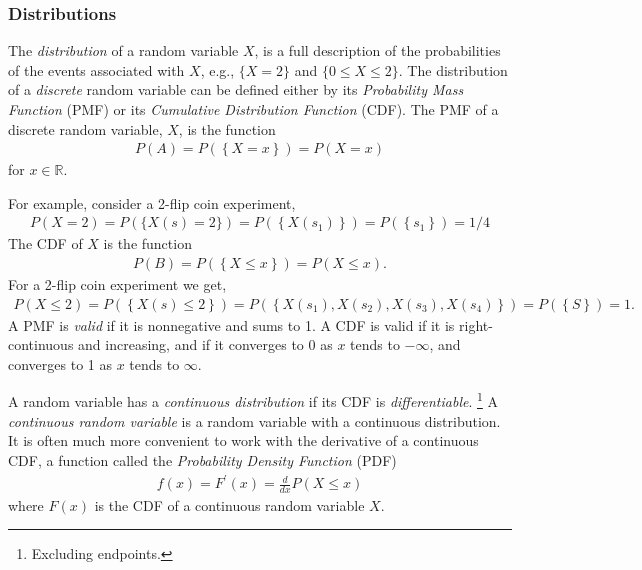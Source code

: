 \documentclass[11pt,a4paper]{article}
\begin{document}
\subsubsection{Distributions}

The \emph{distribution} of a random variable \(X\), 
is a full description of the probabilities of the events associated with \(X\),
e.g., \(\{ X = 2\}\) and \(\{ 0 \leq X \leq 2\}\). 
The distribution of a \emph{discrete} random variable can be defined either 
by its \emph{Probability Mass Function} (PMF) or 
its \emph{Cumulative Distribution Function} (CDF). 
The PMF of a discrete random variable, \(X\), is the function
\begin{align}
P(A) = P\left( \left\{ X = x \right\} \right) = P(X = x)
\end{align}
for \(x \in \mathbb{R}\). 

For example, 
consider a 2-flip coin experiment,
\begin{align}
P(X = 2) = 
P\left( \{ X(s) = 2\} \right) = 
P\left( \left\{ X(s_{1}) \right\} \right) = 
P(\left\{ s_{1} \right\}) = 1/4
\end{align}
The CDF of \(X\) is the function
\begin{align}
P(B) = 
P\left( \left\{ X \leq x \right\} \right) = 
P(X \leq x).
\end{align}
For a 2-flip coin experiment we get,
\begin{align}
P(X \leq 2) = 
P\left( \left\{ X(s) \leq 2 \right\} \right) = 
P\left( \left\{ X\left( s_{1} \right), X\left( s_{2} \right), X\left( s_{3} \right), X\left( s_{4} \right) \right\} \right) = 
P\left( \left\{ S \right\} \right) = 1.
\end{align}
A PMF is \emph{valid} if it is nonnegative and sums to 1. 
A CDF is valid if it is right-continuous and increasing, 
and if it converges to 0 as \(x\) tends to \(- \infty\), 
and converges to 1 as \(x\) tends to \(\infty\).

A random variable has a \emph{continuous distribution} if its 
CDF is \emph{differentiable}.%
\footnote{Excluding endpoints.} 
A \emph{continuous random variable} is a random variable with a continuous distribution. 
It is often much more convenient to work 
with the derivative of a continuous CDF, 
a function called the \emph{Probability Density Function} (PDF)
\begin{align}
f(x) = F^\prime(x) = \frac{d}{dx}P(X \leq x)
\end{align}
where \(F(x)\) is the CDF of a continuous random variable \(X\).
\end{document}
